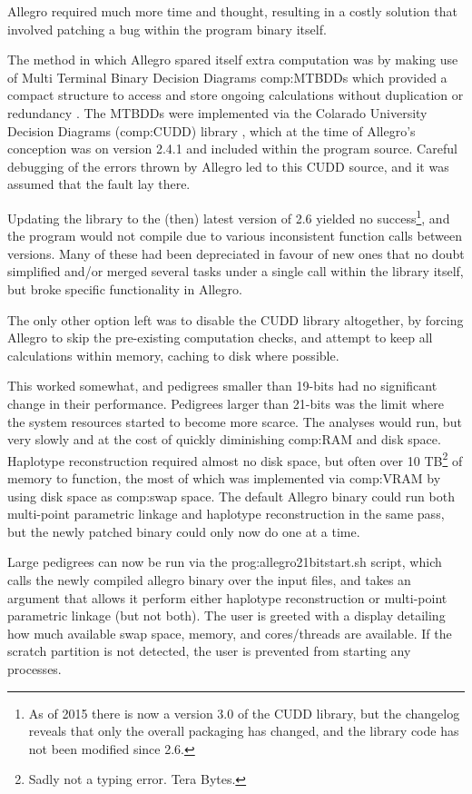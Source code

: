 Allegro required much more time and thought, resulting in a costly solution that involved patching a bug within the program binary itself.

The method in which Allegro spared itself extra computation was by making use of Multi Terminal Binary Decision Diagrams \gls{comp:MTBDD}s which provided a compact structure to access and store ongoing calculations without duplication or redundancy \cite{mtbdd}. The MTBDDs were implemented via the Colarado University Decision Diagrams (\gls{comp:CUDD}) library \citep{cudd}, which at the time of Allegro's conception was on version 2.4.1 and included within the program source. Careful debugging of the errors thrown by Allegro led to this CUDD source, and it was assumed that the fault lay there.

Updating the library to the (then) latest version of 2.6 yielded no success\footnote{As of 2015 there is now a version 3.0 of the CUDD library, but the changelog reveals that only the overall packaging has changed, and the library code has not been modified since 2.6.}, and the program would not compile due to various inconsistent function calls between versions. Many of these had been depreciated in favour of new ones that no doubt simplified and/or merged several tasks under a single call within the library itself, but broke specific functionality in Allegro.

The only other option left was to disable the CUDD library altogether, by forcing Allegro to skip the pre-existing computation checks, and attempt to keep all calculations within memory, caching to disk where possible.

This worked somewhat, and pedigrees smaller than 19-bits had no significant change in their performance. Pedigrees larger than 21-bits was the limit where the system resources started to become more scarce. The analyses would run, but very slowly and at the cost of quickly diminishing \gls{comp:RAM} and disk space. Haplotype reconstruction required almost no disk space, but often over 10 TB\footnote{Sadly not a typing error. Tera Bytes.} of memory to function, the most of which was implemented via \gls{comp:VRAM} by using disk space as \gls{comp:swap space}. The default Allegro binary could run both multi-point parametric linkage and haplotype reconstruction in the same pass, but the newly patched binary could only now do one at a time.

Large pedigrees can now be run via the \gls{prog:allegro21bitstart.sh} script, which calls the newly compiled allegro binary over the input files, and takes an argument that allows it perform either haplotype reconstruction or multi-point parametric linkage (but not both). The user is greeted with a display detailing how much available swap space, memory, and cores/threads are available. If the scratch partition is not detected, the user is prevented from starting any processes.

